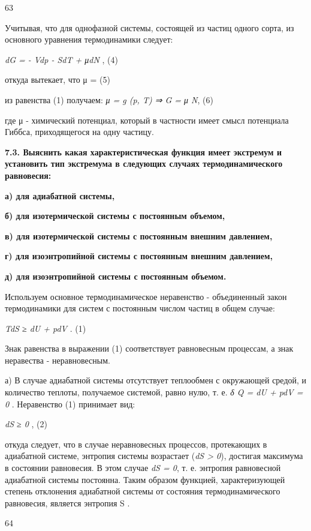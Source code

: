 63

Учитывая, что для однофазной системы, состоящей из частиц одного сорта,
из основного уравнения термодинамики следует:

\emph{dG = - Vdp - SdT + μdN} , (4)

откуда вытекает, что μ =
(5)

из равенства (1) получаем: \emph{μ = g (p, T) ⇒ G = μ N}, (6)

где μ - химический потенциал, который в частности имеет смысл потенциала
Гиббса, приходящегося на одну частицу.

\textbf{7.3. Выяснить какая характеристическая функция имеет экстремум и
установить тип экстремума в следующих случаях термодинамического
равновесия:}

\textbf{а) для адиабатной системы,}

\textbf{б) для изотермической системы с постоянным объемом,}

\textbf{в) для изотермической системы с постоянным внешним давлением,}

\textbf{г) для изоэнтропийной системы с постоянным внешним давлением,}

\textbf{д) для изоэнтропийной системы с постоянным объемом.}

\solving{}

Используем основное термодинамическое неравенство - объединенный закон
термодинамики для систем с постоянным числом частиц в общем случае:

\emph{TdS ≥ dU + pdV} . (1)

Знак равенства в выражении (1) соответствует равновесным процессам, а
знак неравества - неравновесным.

а) В случае адиабатной системы отсутствует теплообмен с окружающей
средой, и количество теплоты, получаемое системой, равно нулю, т. е.
\emph{δ Q = dU + pdV = 0} . Неравенство (1) принимает вид:

\emph{dS ≥ 0} , (2)

откуда следует, что в случае неравновесных процессов, протекающих в
адиабатной системе, энтропия системы возрастает (\emph{dS \textgreater{}
0}), достигая максимума в состоянии равновесия. В этом случае \emph{dS =
0}, т. е. энтропия равновесной адиабатной системы постоянна. Таким
образом функцией, характеризующей степень отклонения адиабатной системы
от состояния термодинамического равновесия, является энтропия S .

64

